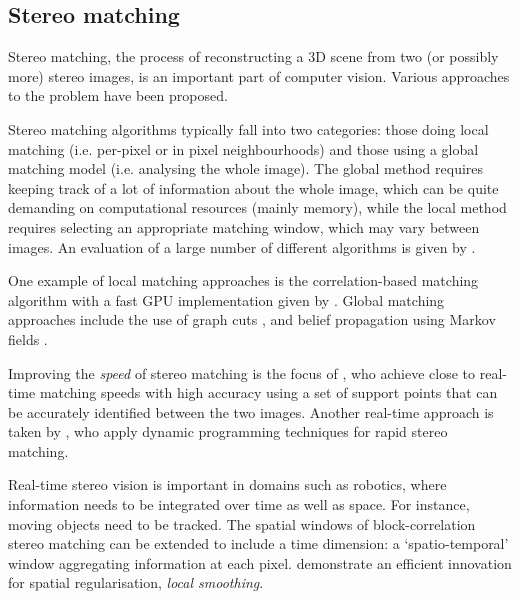 \subsection{Stereo matching}
\label{sec:stereo-prior}

Stereo matching, the process of reconstructing a 3D scene from two (or possibly more) stereo
images, is an important part of computer vision. Various approaches to the
problem have been proposed.

Stereo matching algorithms typically fall into two categories: those doing local
matching (i.e. per-pixel or in pixel neighbourhoods) and those using a global
matching model (i.e. analysing the whole image). The global method requires
keeping track of a lot of information about the whole image, which can be quite
demanding on computational resources (mainly memory), while the local method
requires selecting an appropriate matching window, which may vary between
images. An evaluation of a large number of different algorithms is given by
\citet{stereocorrespondence}.

One example of local matching approaches is the correlation-based matching
algorithm with a fast GPU implementation given by \citet{weber09}. Global
matching approaches include the use of graph cuts
\cite{kolmogorov01:_comput}, and belief propagation using Markov fields
\cite{felzenszwalb06:_effic_belief_propag_early_vision}.

Improving the \emph{speed} of stereo matching is the focus of
\citet{geiger11:_effic_large_scale_stereo_match}, who achieve close to real-time
matching speeds with high accuracy using a set of support points that can be
accurately identified between the two images. Another real-time approach is taken
by \citet{realtimestereo}, who apply dynamic programming techniques for rapid stereo matching.

Real-time stereo vision is important in domains such as robotics, where information needs to be integrated over time as well as space. For instance, moving objects need to be tracked. The spatial windows of block-correlation stereo matching can be extended to include a time dimension: a `spatio-temporal' window aggregating information at each pixel. \citet{tombari_konolige} demonstrate an efficient innovation for spatial regularisation, \emph{local smoothing}.
